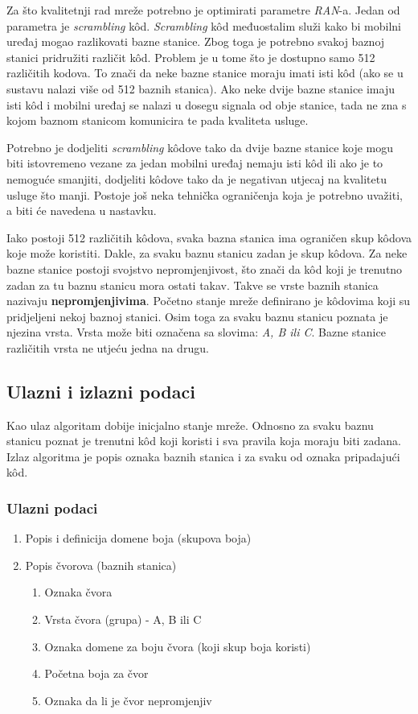 \documentclass[times, utf8, diplomski, numeric]{fer}
\begin{document}
Za što kvalitetnji rad mreže potrebno je optimirati parametre \emph{RAN}-a. Jedan od parametra je \emph{scrambling} k\^{o}d. \emph{Scrambling} k\^{o}d međuostalim služi kako bi mobilni uređaj mogao razlikovati bazne stanice. Zbog toga je potrebno svakoj baznoj stanici pridružiti različit k\^{o}d. Problem je u tome što je dostupno samo 512 različitih kodova. To znači da neke bazne stanice moraju imati isti k\^{o}d (ako se u sustavu nalazi više od 512 baznih stanica). Ako neke dvije bazne stanice imaju isti k\^{o}d i mobilni uređaj se nalazi u dosegu signala od obje stanice, tada ne zna s kojom baznom stanicom komunicira te pada kvaliteta usluge.

Potrebno je dodjeliti \emph{scrambling} k\^{o}dove tako da dvije bazne stanice koje mogu biti istovremeno vezane za jedan mobilni uređaj nemaju isti k\^{o}d ili ako je to nemoguće smanjiti, dodjeliti k\^{o}dove tako da je negativan utjecaj na kvalitetu usluge što manji. Postoje još neka tehnička ograničenja koja je potrebno uvažiti, a biti će navedena u nastavku.

Iako postoji 512 različitih k\^{o}dova, svaka bazna stanica ima ograničen skup k\^{o}dova koje može koristiti. Dakle, za svaku baznu stanicu zadan je skup k\^{o}dova. Za neke bazne stanice postoji svojstvo nepromjenjivost, što znači da k\^{o}d koji je trenutno zadan za tu baznu stanicu mora ostati takav. Takve se vrste baznih stanica nazivaju \textbf{nepromjenjivima}. Početno stanje mreže definirano je k\^{o}dovima koji su pridjeljeni nekoj baznoj stanici. Osim toga za svaku baznu stanicu poznata je njezina vrsta. Vrsta može biti označena sa slovima: \emph{A, B ili C}. Bazne stanice različitih vrsta ne utjeću jedna na drugu.

\subsection{Ulazni i izlazni podaci}

Kao ulaz algoritam dobije inicjalno stanje mreže. Odnosno za svaku baznu stanicu poznat je trenutni k\^{o}d koji koristi i sva pravila koja moraju biti zadana. Izlaz algoritma je popis oznaka baznih stanica i za svaku od oznaka pripadajući k\^{o}d.

\subsubsection{Ulazni podaci}

\begin{enumerate}
	\item Popis i definicija domene boja (skupova boja)
	\item Popis čvorova (baznih stanica)
		\begin{enumerate}
			\item Oznaka čvora
			\item Vrsta čvora (grupa) - A, B ili C
			\item Oznaka domene za boju čvora (koji skup boja koristi)
			\item Početna boja za čvor
			\item Oznaka da li je čvor nepromjenjiv
		\end{enumerate}
\end{enumerate} 
\end{document}
